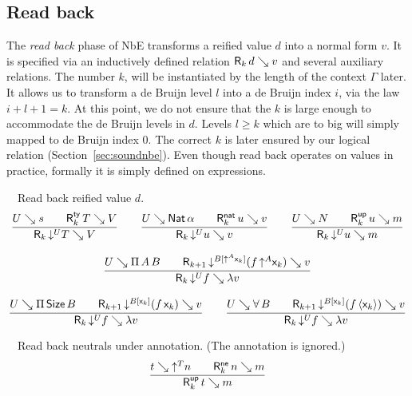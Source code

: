 \documentclass[acmlarge,review,anonymous]{acmart}\settopmatter{printfolios=true}
\begin{document}
\subsection{Read back}
\label{sec:read}

The \emph{read back} phase of NbE \cite{gregoireLeroy:icfp02}
transforms a reified value $d$ into a normal form $v$.  It is
specified via an inductively defined relation $\mathsf{R}_{k} \, d \searrow v$ and several auxiliary relations.
The number $k$, will be instantiated by the length of the context
$\Gamma$ later.  It allows us to transform a de Bruijn level $l$ into a de
Bruijn index $i$, via the law $i + l + 1 = k$.  At this point, we do
not ensure that the $k$ is large enough to accommodate the de Bruijn
levels in $d$.  Levels $l \geq k$ which are to big will simply mapped
to de Bruijn index $0$.  The correct $k$ is later ensured by our
logical relation (Section~\ref{sec:soundnbe}).
Even though read back operates on values in practice, formally it is
simply defined on expressions.

\noindent
{}\ \ Read back reified value $d$.
\begin{gather*}
  \ru{U \evalsto s \qquad
      \RTy k T V
    }{\R k {\down{U} T} V}
\qquad
  \ru{U \evalsto \Nat \alpha \qquad
      \RNat k u v
    }{\R k {\down{U} u} v}
\qquad
  \ru{U \evalsto N \qquad
      \RUp k u m
    }{\R k {\down{U} u} m}
\\[2ex]
  \ru{U \evalsto \piT A B \qquad
      \R{k+1} {\down{B[\up A \lev k]} (f\,\up A \lev k)} v
    }{\R k {\down{U} f} {\lambda v}}
\\[2ex]
  \ru{U \evalsto \piT \Size B \qquad
      \R{k+1} {\down{B[\lev k]} (f\,\lev k)} v
    }{\R k {\down{U} f} {\lambda v}}
\qquad
  \ru{U \evalsto \forallT B \qquad
      \R{k+1} {\down{B[\lev k]} (f\,\ann{\lev k})} v
    }{\R k {\down{U} f} {\lambda v}}
\end{gather*}

\noindent
{}\ \  Read back neutrals under annotation.  (The annotation is ignored.)
\begin{gather*}
  \ru{t \evalsto \up T n \qquad
      \RNe k n m
    }{\RUp k t m}
\end{gather*}
\end{document}
